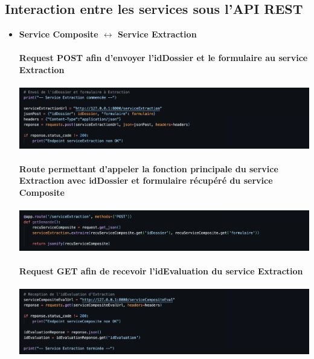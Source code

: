 \documentclass{article}
\begin{document}
        
	\subsection{Interaction entre les services sous l'API REST}
    \begin{itemize}
        \item \textbf{Service Composite $\leftrightarrow$ Service Extraction} \\
        \\
        \textbf{Request POST afin d'envoyer l'idDossier et le formulaire au service Extraction}\\
        \\
        \includegraphics[width=\textwidth]{Images/11.3/requeteExtraction.png}\\
        \\
        \textbf{Route permettant d'appeler la fonction principale du service Extraction avec idDossier et formulaire récupéré du service Composite}\\
        \\
        \includegraphics[width=\textwidth]{Images/11.3/routeExtraction.png}\\
        \\
        \textbf{Request GET afin de recevoir l'idEvaluation du service Extraction}\\
        \\
        \includegraphics[width=\textwidth]{Images/11.3/requeteExtraction2.png}\\
        \\
        
        \newpage
        

\end{itemize}
\end{document}
